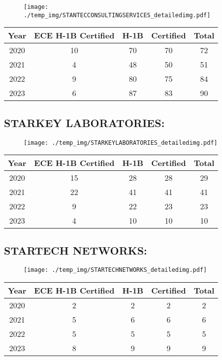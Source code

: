 \documentclass{article}%
\begin{document}
\begin{figure}[htbp]%
\centering%
\texttt{[image: ./temp\_img/STANTECCONSULTINGSERVICES\_detailedimg.pdf]}%
\end{figure}

%
\begin{longtable}{c|c|c|c|c}%
\hline%
Year&ECE H{-}1B Certified&H{-}1B&Certified&Total\\%
\hline%
2020&10&70&70&72\\%
\hline%
2021&4&48&50&51\\%
\hline%
2022&9&80&75&84\\%
\hline%
2023&6&87&83&90\\%
\hline%
\end{longtable}

%
\newpage%
\subsection{STARKEY LABORATORIES:}%
\label{subsec:STARKEYLABORATORIES}%
\label{STARKEYLABORATORIESdetailed}%


\begin{figure}[htbp]%
\centering%
\texttt{[image: ./temp\_img/STARKEYLABORATORIES\_detailedimg.pdf]}%
\end{figure}

%
\begin{longtable}{c|c|c|c|c}%
\hline%
Year&ECE H{-}1B Certified&H{-}1B&Certified&Total\\%
\hline%
2020&15&28&28&29\\%
\hline%
2021&22&41&41&41\\%
\hline%
2022&9&22&23&23\\%
\hline%
2023&4&10&10&10\\%
\hline%
\end{longtable}

%
\newpage%
\subsection{STARTECH NETWORKS:}%
\label{subsec:STARTECHNETWORKS}%
\label{STARTECHNETWORKSdetailed}%


\begin{figure}[htbp]%
\centering%
\texttt{[image: ./temp\_img/STARTECHNETWORKS\_detailedimg.pdf]}%
\end{figure}

%
\begin{longtable}{c|c|c|c|c}%
\hline%
Year&ECE H{-}1B Certified&H{-}1B&Certified&Total\\%
\hline%
2020&2&2&2&2\\%
\hline%
2021&5&6&6&6\\%
\hline%
2022&5&5&5&5\\%
\hline%
2023&8&9&9&9\\%
\hline%
\end{longtable}
\end{document}
